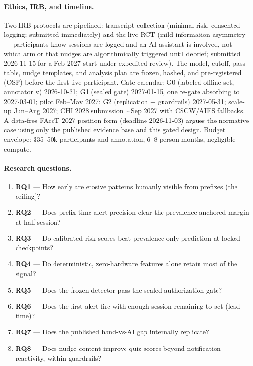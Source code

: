 \documentclass[11pt]{article}
\begin{document}
\paragraph{Ethics, IRB, and timeline.}
Two IRB protocols are pipelined: transcript collection (minimal risk, consented logging; submitted immediately) and the live RCT (mild information asymmetry --- participants know sessions are logged and an AI assistant is involved, not which arm or that nudges are algorithmically triggered until debrief; submitted 2026-11-15 for a Feb 2027 start under expedited review). The model, cutoff, pass table, nudge templates, and analysis plan are frozen, hashed, and pre-registered (OSF) before the first live participant. Gate calendar: G0 (labeled offline set, annotator $\kappa$) 2026-10-31; G1 (sealed gate) 2027-01-15, one re-gate absorbing to 2027-03-01; pilot Feb--May 2027; G2 (replication + guardrails) 2027-05-31; scale-up Jun--Aug 2027; CHI 2028 submission ${\sim}$Sep 2027 with CSCW/AIES fallbacks. A data-free FAccT 2027 position form (deadline 2026-11-03) argues the normative case using only the published evidence base and this gated design. Budget envelope: \$35--50k participants and annotation, 6--8 person-months, negligible compute.

\paragraph{Research questions.}
\begin{enumerate}
  \item \textbf{RQ1} --- How early are erosive patterns humanly visible from prefixes (the ceiling)?
  \item \textbf{RQ2} --- Does prefix-time alert precision clear the prevalence-anchored margin at half-session?
  \item \textbf{RQ3} --- Do calibrated risk scores beat prevalence-only prediction at locked checkpoints?
  \item \textbf{RQ4} --- Do deterministic, zero-hardware features alone retain most of the signal?
  \item \textbf{RQ5} --- Does the frozen detector pass the sealed authorization gate?
  \item \textbf{RQ6} --- Does the first alert fire with enough session remaining to act (lead time)?
  \item \textbf{RQ7} --- Does the published hand-vs-AI gap internally replicate?
  \item \textbf{RQ8} --- Does nudge content improve quiz scores beyond notification reactivity, within guardrails?
\end{enumerate}
\end{document}
